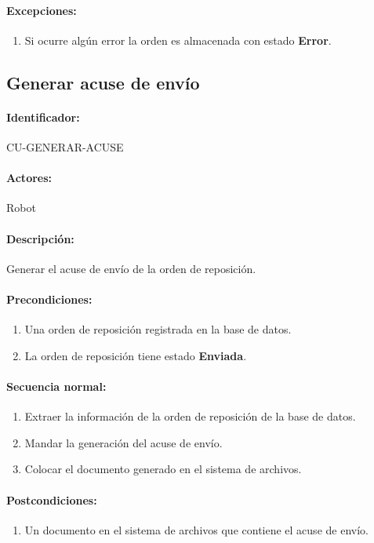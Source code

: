 \paragraph{Excepciones:}
\begin{enumerate}
  \item Si ocurre algún error la orden es almacenada con estado \textbf{Error}.
\end{enumerate}


\subsection{Generar acuse de envío}\label{cu-generar-acuse}
\paragraph{Identificador:}
CU-GENERAR-ACUSE
\paragraph{Actores:}
Robot
\paragraph{Descripción:}
Generar el acuse de envío de la orden de reposición.
\paragraph{Precondiciones:}
\begin{enumerate}
  \item Una orden de reposición registrada en la base de datos.
  \item La orden de reposición tiene estado \textbf{Enviada}.
\end{enumerate}
\paragraph{Secuencia normal:}
\begin{enumerate}
  \item Extraer la información de la orden de reposición de la base de datos.
  \item Mandar la generación del acuse de envío.
  \item Colocar el documento generado en el sistema de archivos.
\end{enumerate}
\paragraph{Postcondiciones:}
\begin{enumerate}
  \item Un documento en el sistema de archivos que contiene el acuse de envío.
\end{enumerate}
